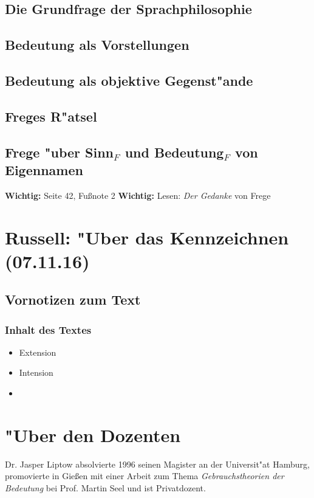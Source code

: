 \documentclass[]{scrartcl}
\begin{document}
\subsection{Die Grundfrage der Sprachphilosophie}

\subsection{Bedeutung als Vorstellungen}

\subsection{Bedeutung als objektive Gegenst"ande}

\subsection{Freges R"atsel}

\subsection{Frege "uber Sinn$_{F}$ und Bedeutung$_{F}$ von Eigennamen}

\textbf{Wichtig:} Seite 42, Fu\ss note 2
\textbf{Wichtig:} Lesen: \emph{Der Gedanke }von Frege


\section{Russell: "Uber das Kennzeichnen\\(07.11.16)}

\subsection{Vornotizen zum Text}
\subsubsection{Inhalt des Textes}

\begin{itemize}
  \item Extension
  \item Intension
  \item 
\end{itemize}


\newpage
\section{"Uber den Dozenten}
Dr. Jasper Liptow absolvierte 1996 seinen Magister an der Universit"at Hamburg, promovierte in Gie\ss en mit einer Arbeit zum Thema \emph{Gebrauchstheorien der Bedeutung} bei Prof. Martin Seel und ist Privatdozent.
\end{document}
